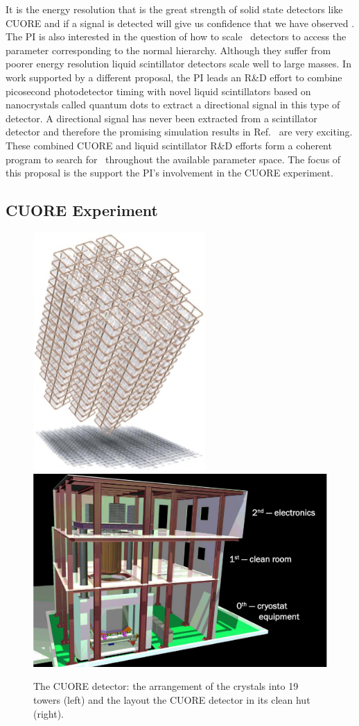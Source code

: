 It is the energy resolution that is the great strength of solid state detectors like CUORE and if a signal is detected will give us confidence that we have observed \zeronu. The PI is also interested in the question of how to scale \zeronu~detectors to access the parameter corresponding to the normal hierarchy. Although they suffer from poorer energy resolution liquid scintillator detectors scale well to large masses. In work supported by a different proposal, the PI  leads an R\&D effort to combine picosecond photodetector timing with novel liquid scintillators based on nanocrystals called quantum dots to extract a directional signal in this type of detector\cite{qdot,qdot2013,direction2013}. A directional signal has never been extracted from a scintillator detector and therefore the promising simulation results in Ref.~\cite{direction2013} are very exciting. These combined CUORE and liquid scintillator R\&D efforts form a coherent program to search for \zeronu~throughout the available parameter space.  The focus of this proposal is the support the PI's involvement in the CUORE experiment.

\subsection{CUORE Experiment}

\begin{figure}
\begin{center}
\includegraphics[width=0.225\columnwidth]{towers.jpg} 
\includegraphics[width=0.505\columnwidth]{CUORE-hut-cross-section-labeled.pdf} 
\end{center}
\caption{\label{layoutCuore} The CUORE detector: the arrangement of the crystals into 19 towers (left) and the layout the CUORE detector in its clean hut (right).  }
\end{figure}

